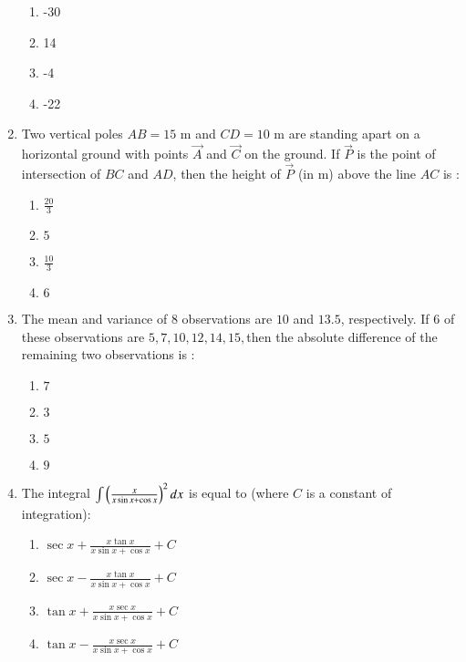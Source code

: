 \documentclass[journal]{IEEEtran}
\begin{document}
\begin{enumerate}
\begin{enumerate}
    \item -30
    \item 14
    \item -4
    \item -22
\end{enumerate}
\item Two vertical poles $ AB = 15 $ m and $CD = 10$ m
are standing apart on a horizontal ground with
points $\vec{A}$ and $\vec{C}$ on the ground. If $\vec{P}$ is the point
of intersection of $BC$ and $AD$, then the height
of $\vec{P}$ (in m) above the line $AC$ is :
\begin{enumerate}
\item  $\frac{20}{3}$
\item  $ 5 $
\item  $ \frac{10}{3}$
\item  $ 6 $
\end{enumerate}
\item The mean and variance of 8 observations are $10$ and $13.5$, respectively. If 6 of these observations are $5, 7, 10, 12, 14, 15, $then the absolute difference of the remaining two observations is :
\begin{enumerate}
\item $7$
\item $3$
\item $5$ 
\item $9$
\end{enumerate}
\item The integral $\int\left(\frac{x}{x\sin x+\cos x}\right)^2 dx$ is equal to (where $C$ is a constant of integration):
\begin{enumerate}
    \item $\sec x+\frac{x\tan x}{x\sin x+\cos x}+C$
    \item $\sec x-\frac{x\tan x}{x\sin x+\cos x}+C$
    \item $\tan x+\frac{x\sec x}{x \sin x + \cos x}+C$
    \item $\tan x-\frac{x\sec x}{x\sin x+\cos x}+C$
\end{enumerate}

\end{enumerate}
\end{document}
